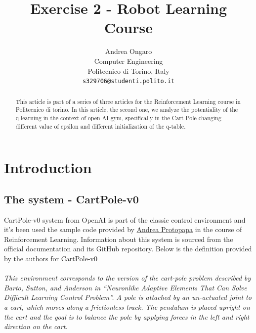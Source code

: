 \documentclass{article}
\title{Exercise 2 - Robot Learning Course}
\author{
  Andrea Ongaro\\
	Computer Engineering\\
	Politecnico di Torino, Italy\\
	\texttt{s329706@studenti.polito.it} \\
}
\begin{document}
\maketitle


\begin{abstract}
This article is part of a series of three articles for the Reinforcement Learning course in Politecnico di torino. 
In this article, the second one, we analyze the potentiality of the q-learning in the context of open AI gym, specifically in the Cart Pole changing different value of epsilon and different initialization of the q-table. 

\end{abstract}



\section{Introduction}
\subsection{The system - CartPole-v0}
CartPole-v0 system from OpenAI is part of the classic control environment and it's been used the sample code provided by \href{https://www.polito.it/personale?p=andrea.protopapa}{Andrea Protopapa} in the course of Reinforcement Learning. Information about this system is sourced from the official documentation \cite{Cart_pole} and its GitHub repository. Below is the definition provided by the authors for CartPole-v0\\ \\
\textit{This environment corresponds to the version of the cart-pole problem described by Barto, Sutton, and Anderson in “Neuronlike Adaptive Elements That Can Solve Difficult Learning Control Problem”. A pole is attached by an un-actuated joint to a cart, which moves along a frictionless track. The pendulum is placed upright on the cart and the goal is to balance the pole by applying forces in the left and right direction on the cart.\citep{Cart_pole}}
\end{document}
